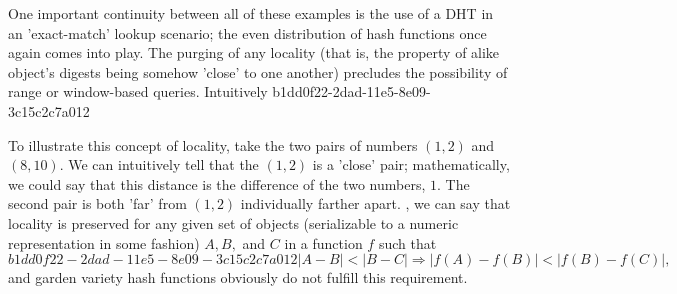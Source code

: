 \documentclass[12pt]{article}
\begin{document}
\par One important continuity between all of these examples is the use of a DHT in an 'exact-match' lookup scenario; the even distribution of hash functions once again comes into play. The purging of any locality (that is, the property of alike object's digests being somehow 'close' to one another) precludes the possibility of range or window-based queries. Intuitively
b1dd0f22-2dad-11e5-8e09-3c15c2c7a012
\par To illustrate this concept of locality, take the two pairs of numbers $(1,2)$ and $(8,10)$. We can intuitively tell that the $(1,2)$ is a 'close' pair; mathematically, we could say that this distance is the difference of the two numbers, $1$. The second pair is both 'far' from $(1,2)$ individually farther apart. , we can say that locality is preserved for any given set of objects (serializable to a numeric representation in some fashion) $A,B,$ and $C$ in a function $f$ such that
\begin{equation}
b1dd0f22-2dad-11e5-8e09-3c15c2c7a012|A-B| < |B-C| \Rightarrow |f(A)-f(B)| < |f(B) - f(C)|,
\end{equation}
and garden variety hash functions obviously do not fulfill this requirement.

\printbibliography
\end{document}

